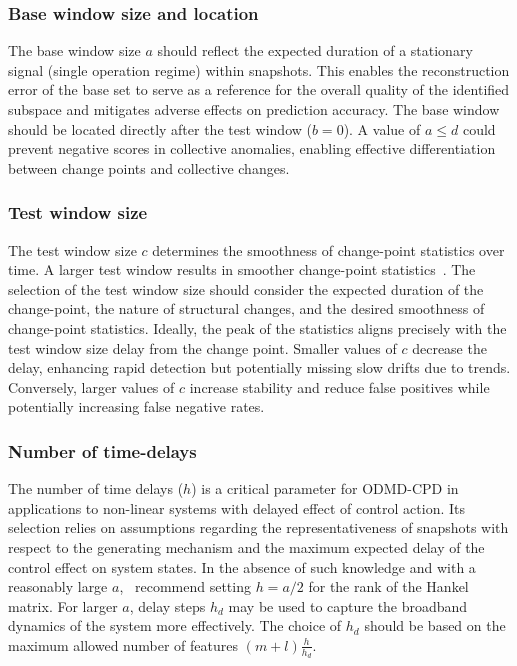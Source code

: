 \subsubsection{Base window size and location}\label{sec:base-window}
The base window size \(a\) should reflect the expected duration of a stationary signal (single operation regime) within snapshots. This enables the reconstruction error of the base set to serve as a reference for the overall quality of the identified subspace and mitigates adverse effects on prediction accuracy. The base window should be located directly after the test window (\(b = 0\)). A value of \(a \leq d\) could prevent negative scores in collective anomalies, enabling effective differentiation between change points and collective changes.

\subsubsection{Test window size}
The test window size \(c\) determines the smoothness of change-point statistics over time. A larger test window results in smoother change-point statistics~\cite{Moskvina2003}. The selection of the test window size should consider the expected duration of the change-point, the nature of structural changes, and the desired smoothness of change-point statistics. Ideally, the peak of the statistics aligns precisely with the test window size delay from the change point. Smaller values of \(c\) decrease the delay, enhancing rapid detection but potentially missing slow drifts due to trends. Conversely, larger values of \(c\) increase stability and reduce false positives while potentially increasing false negative rates.

\subsubsection{Number of time-delays}
The number of time delays (\(h\)) is a critical parameter for ODMD-CPD in applications to non-linear systems with delayed effect of control action. Its selection relies on assumptions regarding the representativeness of snapshots with respect to the generating mechanism and the maximum expected delay of the control effect on system states. In the absence of such knowledge and with a reasonably large \(a\),~\cite{Moskvina2003} recommend setting \(h = a / 2\) for the rank of the Hankel matrix. For larger \(a\), delay steps \(h_d\) may be used to capture the broadband dynamics of the system more effectively. The choice of \(h_d\) should be based on the maximum allowed number of features \((m + l)\frac{h}{h_d}\).

